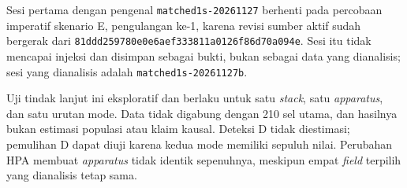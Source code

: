 Sesi pertama dengan pengenal \texttt{matched1s-20261127} berhenti pada percobaan imperatif skenario E, pengulangan ke-1, karena revisi sumber aktif sudah bergerak dari \texttt{81ddd259780e0e6aef333811a0126f86d70a094e}. Sesi itu tidak mencapai injeksi dan disimpan sebagai bukti, bukan sebagai data yang dianalisis; sesi yang dianalisis adalah \texttt{matched1s-20261127b}.

Uji tindak lanjut ini eksploratif dan berlaku untuk satu \textit{stack}, satu \textit{apparatus}, dan satu urutan mode. Data tidak digabung dengan 210 sel utama, dan hasilnya bukan estimasi populasi atau klaim kausal. Deteksi D tidak diestimasi; pemulihan D dapat diuji karena kedua mode memiliki sepuluh nilai. Perubahan HPA membuat \textit{apparatus} tidak identik sepenuhnya, meskipun empat \textit{field} terpilih yang dianalisis tetap sama.
